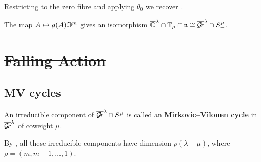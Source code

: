 \documentclass{article} %
\begin{document}
Restricting to the zero fibre and applying $\theta_0$ we recover \cite[Corollary~5.2.2]{dthesis}. 
% 
% 
\begin{corollary}
    \label{cor:mvy}
The map $ A \mapsto g(A)\mathbb O^m$ gives an isomorphism    $\overline{\mathbb O}^\lambda \cap \mathbb T_\mu\cap\mathfrak n \cong\overline{\mathcal{G}\!r}^\lambda\cap S^\mu_-$.
\end{corollary}


\section{\sout{Falling Action}} %
\subsection{MV cycles}
% 
% 
% 
\begin{definition}
An irreducible component of $\overline{\mathcal{G}\!r}^\lambda \cap S^\mu$ is called an \textbf{Mirkovic--Vilonen cycle} in $\overline{\mathcal{G}\!r}^\lambda$ of coweight $\mu$.
\end{definition}


By \cite{mirkovic2007geometric}, all these irreducible components have dimension $ \rho(\lambda - \mu)$, where $ \rho = (m, m-1, \dots, 1)$.

\end{document}
